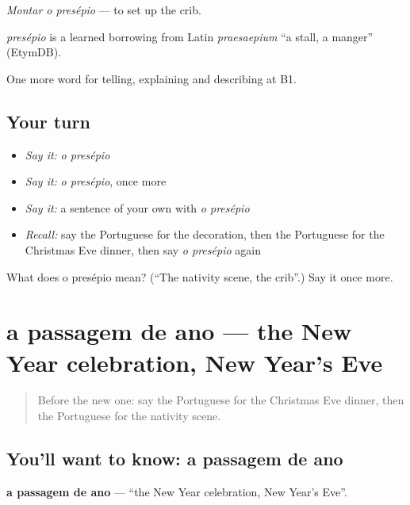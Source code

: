 \emph{Montar o presépio} — to set up the crib.

\begin{cousinweb}
\emph{presépio} is a learned borrowing from Latin \emph{praesaepium} \textquotedblleft{}a stall, a manger\textquotedblright{} (EtymDB).
\end{cousinweb}

\begin{grammarlens}[title={What you've built}]
One more word for telling, explaining and describing at B1.
\end{grammarlens}

\subsection*{Your turn}
\begin{itemize}
\raggedright
  \item \emph{Say it:} \emph{o presépio}
  \item \emph{Say it:} \emph{o presépio}, once more
  \item \emph{Say it:} a sentence of your own with \emph{o presépio}
  \item \emph{Recall:} say the Portuguese for the decoration, then the Portuguese for the Christmas Eve dinner, then say \emph{o presépio} again
\end{itemize}

\begin{tcolorbox}[breakable,colback=teal!4,colframe=teal!35!black,title={Before you move on}]
What does o presépio mean? (\textquotedblleft{}The nativity scene, the crib\textquotedblright{}.) Say it once more.
\end{tcolorbox}
\section[a passagem de ano]{a passagem de ano — the New Year celebration, New Year’s Eve}

\label{lesson:PT-C323-passagem-de-ano}



\begin{quote}
Before the new one: say the Portuguese for the Christmas Eve dinner, then the Portuguese for the nativity scene.
\end{quote}

\subsection*{You'll want to know: a passagem de ano}
\textbf{a passagem de ano} — \textquotedblleft{}the New Year celebration, New Year’s Eve\textquotedblright{}.

